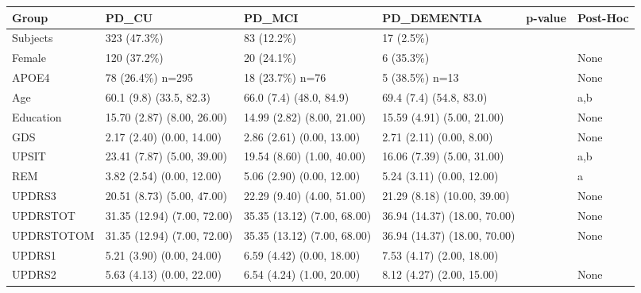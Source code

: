 \documentclass[1pt]{article}
\begin{document}
\begin{landscape}
\begin{tabular}{llllll}
	\toprule
	Group &                              PD\_CU &                             PD\_MCI &                        PD\_DEMENTIA & p-value & Post-Hoc \\
	\midrule
	Subjects &                        323 (47.3\%) &                         83 (12.2\%) &                          17 (2.5\%) &         &          \\
	Female &                        120 (37.2\%) &                         20 (24.1\%) &                          6 (35.3\%) &         &     None \\
	APOE4 &                   78 (26.4\%) n=295 &                    18 (23.7\%) n=76 &                     5 (38.5\%) n=13 &         &     None \\
	Age &            60.1 (9.8) (33.5, 82.3) &            66.0 (7.4) (48.0, 84.9) &            69.4 (7.4) (54.8, 83.0) &         &      a,b \\
	Education &         15.70 (2.87) (8.00, 26.00) &         14.99 (2.82) (8.00, 21.00) &         15.59 (4.91) (5.00, 21.00) &         &     None \\
	GDS &          2.17 (2.40) (0.00, 14.00) &          2.86 (2.61) (0.00, 13.00) &           2.71 (2.11) (0.00, 8.00) &         &     None \\
	UPSIT &         23.41 (7.87) (5.00, 39.00) &         19.54 (8.60) (1.00, 40.00) &         16.06 (7.39) (5.00, 31.00) &         &      a,b \\
	REM &          3.82 (2.54) (0.00, 12.00) &          5.06 (2.90) (0.00, 12.00) &          5.24 (3.11) (0.00, 12.00) &         &        a \\
	UPDRS3 &         20.51 (8.73) (5.00, 47.00) &         22.29 (9.40) (4.00, 51.00) &        21.29 (8.18) (10.00, 39.00) &         &     None \\
	UPDRSTOT &        31.35 (12.94) (7.00, 72.00) &        35.35 (13.12) (7.00, 68.00) &       36.94 (14.37) (18.00, 70.00) &         &     None \\
	UPDRSTOTOM &        31.35 (12.94) (7.00, 72.00) &        35.35 (13.12) (7.00, 68.00) &       36.94 (14.37) (18.00, 70.00) &         &     None \\
	UPDRS1 &          5.21 (3.90) (0.00, 24.00) &          6.59 (4.42) (0.00, 18.00) &          7.53 (4.17) (2.00, 18.00) &         &          \\
	UPDRS2 &          5.63 (4.13) (0.00, 22.00) &          6.54 (4.24) (1.00, 20.00) &          8.12 (4.27) (2.00, 15.00) &         &     None \\

\end{tabular}
\end{landscape}
\end{document}
